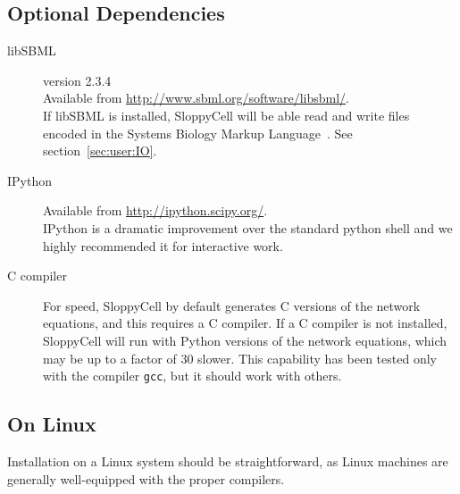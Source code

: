 \documentclass[12pt]{article}
\newcommand{\filename}[1]{\texttt{#1}}
\begin{document}
\subsection{Optional Dependencies}

\begin{description}

\item[libSBML] version 2.3.4\\
Available from \url{http://www.sbml.org/software/libsbml/}.\\
If libSBML is installed, SloppyCell will be able read and write files encoded in the Systems Biology Markup Language~\cite{bib:Hucka2003}. See section~\ref{sec:user:IO}.

\item[IPython]
Available from \url{http://ipython.scipy.org/}.\\
IPython is a dramatic improvement over the standard python shell and we highly recommended it for interactive work.

\item[C compiler]
For speed, SloppyCell by default generates C versions of the network equations, and this requires a C compiler. 
If a C compiler is not installed, SloppyCell will run with Python versions of the network equations, which may be up to a factor of 30 slower. 
This capability has been tested only with the compiler \filename{gcc}, but it should work with others.


\end{description}

\subsection{On Linux}
Installation on a Linux system should be straightforward, as Linux machines are generally well-equipped with the proper compilers.
\end{document}

